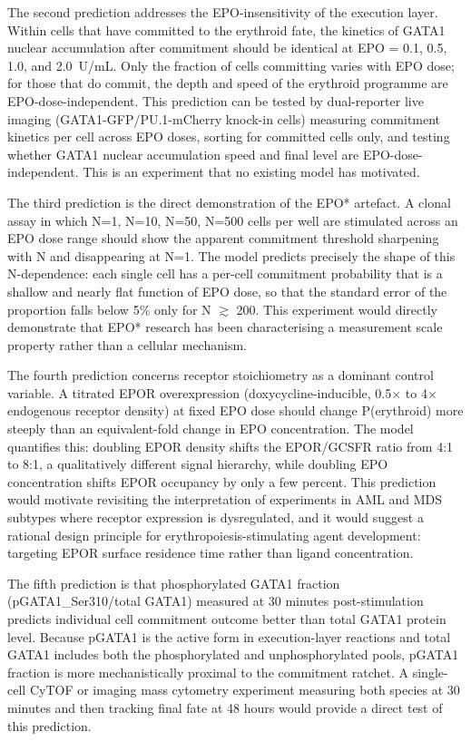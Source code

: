 The second prediction addresses the EPO-insensitivity of the execution layer. Within cells that have committed to the erythroid fate, the kinetics of GATA1 nuclear accumulation after commitment should be identical at EPO = 0.1, 0.5, 1.0, and 2.0~U/mL. Only the fraction of cells committing varies with EPO dose; for those that do commit, the depth and speed of the erythroid programme are EPO-dose-independent. This prediction can be tested by dual-reporter live imaging (GATA1-GFP/PU.1-mCherry knock-in cells) measuring commitment kinetics per cell across EPO doses, sorting for committed cells only, and testing whether GATA1 nuclear accumulation speed and final level are EPO-dose-independent. This is an experiment that no existing model has motivated.

The third prediction is the direct demonstration of the EPO* artefact. A clonal assay in which N=1, N=10, N=50, N=500 cells per well are stimulated across an EPO dose range should show the apparent commitment threshold sharpening with N and disappearing at N=1. The model predicts precisely the shape of this N-dependence: each single cell has a per-cell commitment probability that is a shallow and nearly flat function of EPO dose, so that the standard error of the proportion falls below 5\% only for N $\gtrsim$ 200. This experiment would directly demonstrate that EPO* research has been characterising a measurement scale property rather than a cellular mechanism.

The fourth prediction concerns receptor stoichiometry as a dominant control variable. A titrated EPOR overexpression (doxycycline-inducible, 0.5$\times$ to 4$\times$ endogenous receptor density) at fixed EPO dose should change P(erythroid) more steeply than an equivalent-fold change in EPO concentration. The model quantifies this: doubling EPOR density shifts the EPOR/GCSFR ratio from 4:1 to 8:1, a qualitatively different signal hierarchy, while doubling EPO concentration shifts EPOR occupancy by only a few percent. This prediction would motivate revisiting the interpretation of experiments in AML and MDS subtypes where receptor expression is dysregulated, and it would suggest a rational design principle for erythropoiesis-stimulating agent development: targeting EPOR surface residence time rather than ligand concentration.

The fifth prediction is that phosphorylated GATA1 fraction (pGATA1\_Ser310/total GATA1) measured at 30 minutes post-stimulation predicts individual cell commitment outcome better than total GATA1 protein level. Because pGATA1 is the active form in execution-layer reactions and total GATA1 includes both the phosphorylated and unphosphorylated pools, pGATA1 fraction is more mechanistically proximal to the commitment ratchet. A single-cell CyTOF or imaging mass cytometry experiment measuring both species at 30 minutes and then tracking final fate at 48 hours would provide a direct test of this prediction.


